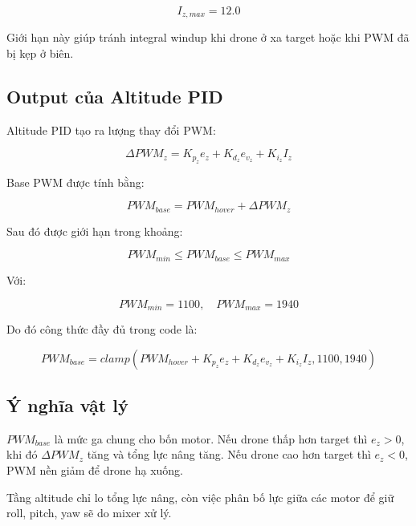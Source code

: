 \begin{equation}
    I_{z,max}=12.0
\end{equation}

Giới hạn này giúp tránh integral windup khi drone ở xa target hoặc khi PWM đã
bị kẹp ở biên.

\subsection{Output của Altitude PID}

Altitude PID tạo ra lượng thay đổi PWM:

\begin{equation}
    \Delta PWM_z
    =
    K_{p_z}e_z
    +
    K_{d_z}e_{v_z}
    +
    K_{i_z}I_z
\end{equation}

Base PWM được tính bằng:

\begin{equation}
    PWM_{base}
    =
    PWM_{hover}
    +
    \Delta PWM_z
\end{equation}

Sau đó được giới hạn trong khoảng:

\begin{equation}
    PWM_{min}
    \leq
    PWM_{base}
    \leq
    PWM_{max}
\end{equation}

Với:

\begin{equation}
    PWM_{min}=1100,\quad PWM_{max}=1940
\end{equation}

Do đó công thức đầy đủ trong code là:

\begin{equation}
    PWM_{base}
    =
    clamp(
    PWM_{hover}
    +
    K_{p_z}e_z
    +
    K_{d_z}e_{v_z}
    +
    K_{i_z}I_z,
    1100,
    1940
    )
\end{equation}

\subsection{Ý nghĩa vật lý}

$PWM_{base}$ là mức ga chung cho bốn motor. Nếu drone thấp hơn target thì
$e_z>0$, khi đó $\Delta PWM_z$ tăng và tổng lực nâng tăng. Nếu drone cao hơn
target thì $e_z<0$, PWM nền giảm để drone hạ xuống.

Tầng altitude chỉ lo tổng lực nâng, còn việc phân bố lực giữa các motor để giữ
roll, pitch, yaw sẽ do mixer xử lý.

